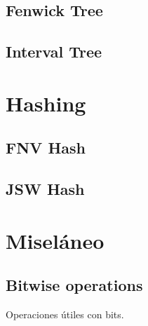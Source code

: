 \documentclass[10pt,letterpaper,twocolumn,twosided]{article}
\newcommand{\codigofuente}[1]{

\dotfill
}
\begin{document}
\subsection{Fenwick Tree}

\subsection{Interval Tree}

\section{Hashing} %

\subsection{FNV Hash}

\subsection{JSW Hash}

\section{Miseláneo}

\subsection {Bitwise operations}
Operaciones útiles con bits.

\codigofuente{../src/bitwise.${EXT}}
\end{document}
